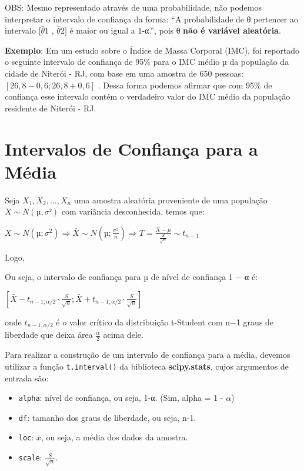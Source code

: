 \documentclass[
  letterpaper,
  DIV=11,
  numbers=noendperiod]{scrreprt}
\providecommand{\tightlist}{%
  \setlength{\itemsep}{0pt}\setlength{\parskip}{0pt}}\usepackage{longtable,booktabs,array}
\begin{document}
OBS: Mesmo representado através de uma probabilidade, não podemos
interpretar o intervalo de confiança da forma: ``A probabilidade de θ
pertencer ao intervalo \([\hat{θ}{1}\) , \(\hat{θ}{2}]\) é maior ou
igual a 1-α.'', pois θ \textbf{não é variável aleatória}.

\textbf{Exemplo}: Em um estudo sobre o Índice de Massa Corporal (IMC),
foi reportado o seguinte intervalo de confiança de 95\% para o IMC médio
µ da população da cidade de Niterói - RJ, com base em uma amostra de 650
pessoas: \([26, 8 − 0, 6; 26, 8 + 0, 6]\) . Dessa forma podemos afirmar
que com 95\% de confiança esse intervalo contém o verdadeiro valor do
IMC médio da população residente de Niterói - RJ.


\hypertarget{intervalos-de-confianuxe7a-para-a-muxe9dia}{%
\chapter{Intervalos de Confiança para a
Média}\label{intervalos-de-confianuxe7a-para-a-muxe9dia}}

Seja \(X_{1}, X_{2}, \ldots, X_{n}\) uma amostra aleatória proveniente
de uma população \(X \sim N(µ,σ²)\) com variância desconhecida, temos
que:

\(X \sim N(µ; σ^{2})⇒ \bar{X} ∼ N(µ;\frac{\sigma^{2}}{n}) ⇒ T = \frac{\bar{X}-\mu }{\frac{S}{\sqrt{n}}} ∼ t_{n−1}\)

Logo,

Ou seja, o intervalo de confiança para µ de nível de confiança 1 − α é:

\(\left [ \bar{X}-t_{n-1;\alpha /2}\cdot \frac{S}{\sqrt{n}};\bar{X}+t_{n-1;\alpha /2}\cdot \frac{S}{\sqrt{n}} \right ]\)

onde \(t_{n−1, α/2}\) é o valor crítico da distribuição t-Student com
n−1 graus de liberdade que deixa área \(\frac{α}{2}\) acima dele.

Para realizar a construção de um intervalo de confiança para a média,
devemos utilizar a função \texttt{t.interval()} da biblioteca
\textbf{scipy.stats}, cujos argumentos de entrada são:

\begin{itemize}
\tightlist
\item
  \texttt{alpha}: nível de confiança, ou seja, 1-α. (Sim, alpha = 1 -
  \(\alpha\))
\item
  \texttt{df}: tamanho dos graus de liberdade, ou seja, n-1.
\item
  \texttt{loc}: \(\bar{x}\), ou seja, a média dos dados da amostra.
\item
  \texttt{scale}: \(\frac{S}{\sqrt{n}}\).
\end{itemize}
\end{document}
